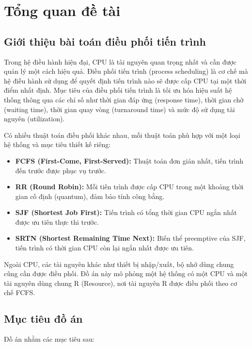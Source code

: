 \chapter{Tổng quan đề tài}

\section{Giới thiệu bài toán điều phối tiến trình}

Trong hệ điều hành hiện đại, CPU là tài nguyên quan trọng nhất và cần được quản lý một cách hiệu quả. Điều phối tiến trình (process scheduling) là cơ chế mà hệ điều hành sử dụng để quyết định tiến trình nào sẽ được cấp CPU tại một thời điểm nhất định. Mục tiêu của điều phối tiến trình là tối ưu hóa hiệu suất hệ thống thông qua các chỉ số như thời gian đáp ứng (response time), thời gian chờ (waiting time), thời gian quay vòng (turnaround time) và mức độ sử dụng tài nguyên (utilization).

Có nhiều thuật toán điều phối khác nhau, mỗi thuật toán phù hợp với một loại hệ thống và mục tiêu thiết kế riêng:
\begin{itemize}
    \item \textbf{FCFS (First-Come, First-Served):} Thuật toán đơn giản nhất, tiến trình đến trước được phục vụ trước.
    \item \textbf{RR (Round Robin):} Mỗi tiến trình được cấp CPU trong một khoảng thời gian cố định (quantum), đảm bảo tính công bằng.
    \item \textbf{SJF (Shortest Job First):} Tiến trình có tổng thời gian CPU ngắn nhất được ưu tiên thực thi trước.
    \item \textbf{SRTN (Shortest Remaining Time Next):} Biến thể preemptive của SJF, tiến trình có thời gian CPU còn lại ngắn nhất được ưu tiên.
\end{itemize}

Ngoài CPU, các tài nguyên khác như thiết bị nhập/xuất, bộ nhớ dùng chung cũng cần được điều phối. Đồ án này mô phỏng một hệ thống có một CPU và một tài nguyên dùng chung R (Resource), nơi tài nguyên R được điều phối theo cơ chế FCFS.

\section{Mục tiêu đồ án}

Đồ án nhằm các mục tiêu sau:

